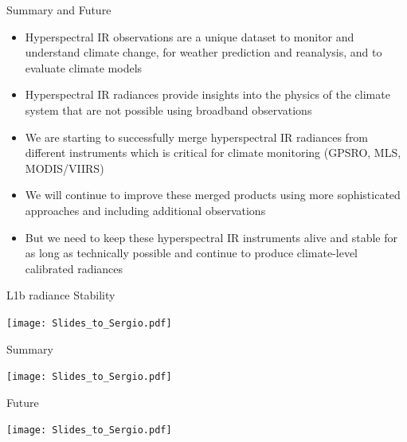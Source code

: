 \documentclass[10pt,t]{beamer}
\begin{document}
\begin{frame}{Summary and Future}
\begin{itemize}

\item Hyperspectral IR observations are a unique dataset to monitor
  and understand climate change, for weather prediction and
  reanalysis, and to evaluate climate models

\item Hyperspectral IR radiances provide insights into the physics of
  the climate system that are not possible using broadband
  observations

\item We are starting to successfully merge hyperspectral IR radiances
  from different instruments which is critical for climate monitoring
  (GPSRO, MLS, MODIS/VIIRS)

\item We will continue to improve these merged products using more
  sophisticated approaches and including additional observations

\item But we need to keep these hyperspectral IR instruments alive and
  stable for as long as technically possible and continue to produce
  climate-level calibrated radiances

\end{itemize}
\end{frame}

\begin{frame}{L1b radiance Stability}
\vspace{-0.35in}
\begin{center}
\texttt{[image: Slides\_to\_Sergio.pdf]}
\end{center}
\end{frame}

\begin{frame}{Summary}
\vspace{-0.35in}
\begin{center}
\texttt{[image: Slides\_to\_Sergio.pdf]}
\end{center}
\end{frame}

\begin{frame}{Future}
\vspace{-0.35in}
\begin{center}
\texttt{[image: Slides\_to\_Sergio.pdf]}
\end{center}
\end{frame}
\end{document}
